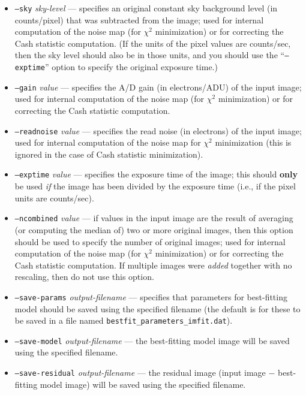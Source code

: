\documentclass[10pt,a4paper,article]{memoir}
\newcommand{\chisquare}{\ensuremath{\chi^{2}}}
\begin{document}
\begin{itemize}
\item \texttt{--sky} \textit{sky-level} --- specifies an original constant sky background
level (in counts/pixel) that was subtracted from the image; used for internal
computation of the noise map (for \chisquare{} minimization) or for correcting the 
Cash statistic computation. (If the units of the pixel values are counts/sec, then the sky level
should also be in those units, and you should use the ``\texttt{--exptime}'' option
to specify the original exposure time.)
\item \texttt{--gain} \textit{value} --- specifies the A/D gain (in electrons/ADU)
of the input image; used for internal computation of the noise map (for \chisquare{}
minimization) or for correcting the Cash statistic computation.
\item \texttt{--readnoise} \textit{value} --- specifies the read noise (in electrons)
of the input image; used for internal computation of the noise map for \chisquare{}
minimization (this is ignored in the case of Cash statistic minimization).
\item \texttt{--exptime} \textit{value} --- specifies the exposure time of the image;
this should \textbf{only} be used \textit{if} the image has been divided by the exposure time
(i.e., if the pixel units are counts/sec).
\item \texttt{--ncombined} \textit{value} --- if values in the input
image are the result of averaging (or computing the median of) two or
more original images, then this option should be used to specify the
number of original images; used for internal computation of the noise map (for \chisquare{}
minimization) or for correcting the Cash statistic computation.  If multiple images were
\textit{added} together with no rescaling, then do not use this option.

\bigskip

\item \texttt{--save-params} \textit{output-filename} --- specifies that parameters 
for best-fitting model should be saved using the specified filename (the default is
for these to be saved in a file named \texttt{bestfit\_parameters\_imfit.dat}).
\item \texttt{--save-model} \textit{output-filename} --- the best-fitting model image
will be saved using the specified filename.
\item \texttt{--save-residual} \textit{output-filename} --- the residual image (input
image $-$ best-fitting model image) will be saved using the specified filename.


\end{itemize}
\end{document}
